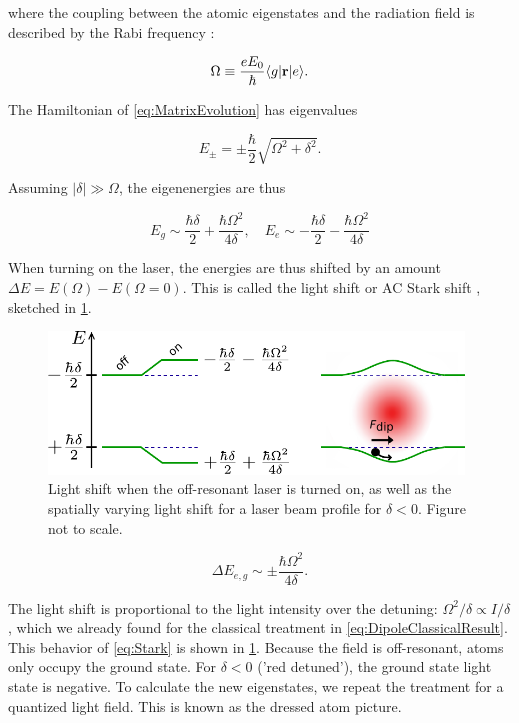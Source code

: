 where the coupling between the atomic eigenstates and the radiation field is described by the Rabi frequency \cite{Metcalf1999}:

\begin{equation}\label{eq:RabiFrequencyMain}
	\Omega \equiv \frac{e E_0}{\hbar} \langle g\rvert\mathbf{r}\lvert e\rangle.
\end{equation}

The Hamiltonian of \cref{eq:MatrixEvolution} has eigenvalues 

\begin{equation}\label{eq:EigenValues}
	E_{\pm} = \pm
	\frac{\hbar}{2} \sqrt{\Omega^2+\delta^2}.
\end{equation}

Assuming $|\delta| \gg \Omega$, the eigenenergies are thus 

\begin{equation}\label{eq:SemiClassicalEigenvalues}
	E_g \sim  \frac{\hbar \delta}{2} +\frac{\hbar \Omega^2}{4 \delta}, \quad
	E_e \sim -\frac{\hbar \delta}{2} -\frac{\hbar \Omega^2}{4 \delta}
\end{equation}

When turning on the laser, the energies are thus shifted by an amount $\Delta E = E(\Omega)-E(\Omega=0)$. 
This is called the light shift or AC Stark shift \cite{Metcalf1999}, sketched in \cref{fig:DipoleForce}.

\begin{figure}
    \centering
	\includegraphics[height=3.8cm]{figures/LightShift.pdf}
	\caption{Light shift when the off-resonant laser is turned on, as well as the spatially varying light shift for a laser beam profile for $\delta<0$. 
	Figure not to scale.}
	\label{fig:DipoleForce}
\end{figure}

\begin{equation}\label{eq:Stark}
	\Delta E_{e,g} \sim \pm \frac{\hbar \Omega^2}{4 \delta}.
\end{equation}

The light shift is proportional to the light intensity over the detuning: $\Omega^2 / \delta \propto I / \delta$, which we already found for the classical treatment in \cref{eq:DipoleClassicalResult}. 
This behavior of \cref{eq:Stark} is shown in \cref{fig:DipoleForce}. Because the field is off-resonant, atoms only occupy the ground state. 
For $\delta <0$ ('red detuned'), the ground state light state is negative. 
To calculate the new eigenstates, we repeat the treatment for a quantized light field.
This is known as the dressed atom picture.

